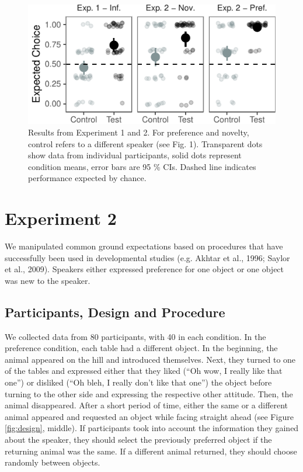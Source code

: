 \documentclass[10pt, letterpaper]{article}
\newenvironment{CodeChunk}{}{}
\begin{document}
\begin{CodeChunk}
\begin{figure}[H]

{\centering \includegraphics{figs/plotexp12-1} 

}

\caption[Results from Experiment 1 and 2]{Results from Experiment 1 and 2. For preference and novelty, control refers to a different speaker (see Fig. 1). Transparent dots show data from individual participants, solid dots represent condition means, error bars are 95 \% CIs. Dashed line indicates performance expected by chance.}\label{fig:plotexp12}
\end{figure}
\end{CodeChunk}

\section{Experiment 2}\label{experiment-2}

We manipulated common ground expectations based on procedures that have
successfully been used in developmental studies (e.g. Akhtar et al.,
1996; Saylor et al., 2009). Speakers either expressed preference for one
object or one object was new to the speaker.

\subsection{Participants, Design and
Procedure}\label{participants-design-and-procedure-1}

We collected data from 80 participants, with 40 in each condition. In
the preference condition, each table had a different object. In the
beginning, the animal appeared on the hill and introduced themselves.
Next, they turned to one of the tables and expressed either that they
liked (``Oh wow, I really like that one'') or disliked (``Oh bleh, I
really don't like that one'') the object before turning to the other
side and expressing the respective other attitude. Then, the animal
disappeared. After a short period of time, either the same or a
different animal appeared and requested an object while facing straight
ahead (see Figure \ref{fig:design}, middle). If participants took into
account the information they gained about the speaker, they should
select the previously preferred object if the returning animal was the
same. If a different animal returned, they should choose randomly
between objects.
\end{document}
